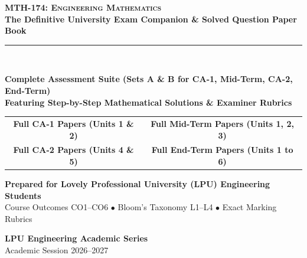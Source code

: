 \begin{titlepage}
\pagecolor{LPUNavy}
\color{white}
\vspace*{1.5cm}

\begin{center}
    {\Huge \bfseries \scshape MTH-174: Engineering Mathematics}\\[5mm]
    {\LARGE \bfseries The Definitive University Exam Companion \& Solved Question Paper Book}\\[8mm]
    {\color{LPUOrange}\rule{0.8\textwidth}{2pt}}\\[10mm]

    \begin{tcolorbox}[enhanced, width=0.88\textwidth, colback=white, colframe=LPUOrange, boxrule=1.5pt, arc=3mm, halign=center]
        \color{DarkSlate}
        \vspace{2mm}
        {\Large\bfseries Complete Assessment Suite (Sets A \& B for CA-1, Mid-Term, CA-2, End-Term)}\\[3mm]
        {\large\bfseries Featuring Step-by-Step Mathematical Solutions \& Examiner Rubrics}\\[3mm]
        \begin{tabular}{cc}
            \color{LPUNavy}\textbf{Full CA-1 Papers (Units 1 \& 2)} & \quad \color{LPUNavy}\textbf{Full Mid-Term Papers (Units 1, 2, 3)} \\
            \color{LPUNavy}\textbf{Full CA-2 Papers (Units 4 \& 5)} & \quad \color{LPUNavy}\textbf{Full End-Term Papers (Units 1 to 6)} \\
        \end{tabular}
        \vspace{2mm}
    \end{tcolorbox}

    \vfill

    {\large \bfseries Prepared for Lovely Professional University (LPU) Engineering Students}\\[2mm]
    {\small Course Outcomes CO1--CO6 $\bullet$ Bloom's Taxonomy L1--L4 $\bullet$ Exact Marking Rubrics}\\[10mm]

    \begin{tcolorbox}[width=0.6\textwidth, colback=LPUNavy!80!black, colframe=white, boxrule=0.5pt, halign=center]
        \color{white}
        \textbf{LPU Engineering Academic Series}\\[1mm]
        {\footnotesize Academic Session 2026--2027}
    \end{tcolorbox}
    \vspace*{1cm}
\end{center}
\end{titlepage}
\nopagecolor
\newpage

